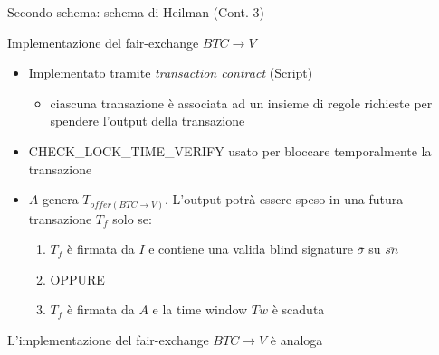 \documentclass{beamer}
\begin{document}
  
  
  \begin{frame}{Secondo schema: schema di Heilman (Cont. 3)}
      \begin{block}{Implementazione del fair-exchange $BTC\rightarrow V$}
        \begin{itemize}
            \item Implementato tramite \emph{transaction contract} (Script)
            \begin{itemize}
                \item[\MVRightarrow] ciascuna transazione è associata ad un insieme di regole richieste per spendere l'output della transazione
            \end{itemize}
            \item CHECK\_LOCK\_TIME\_VERIFY usato per bloccare temporalmente la transazione
            \item $A$ genera $T_{offer(BTC\rightarrow V)}$. L'output potrà essere speso in una futura transazione $T_f$ solo se:
            \begin{enumerate}
                \item $T_f$ è firmata da $I$ e contiene una valida blind signature $\overline\sigma$ su $\overline{sn}$
                \item[] OPPURE 
                \item $T_f$ è firmata da $A$ e la time window $Tw$ è scaduta
            \end{enumerate}
        \end{itemize}
      \end{block}
      \pause
      
      L'implementazione del fair-exchange $BTC\rightarrow V$ è analoga
  \end{frame}
  
  
  
\end{document}
